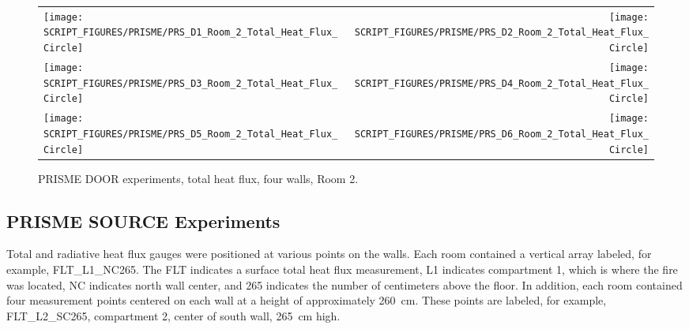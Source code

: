 \begin{figure}[p]
\begin{tabular*}{\textwidth}{l@{\extracolsep{\fill}}r}
\texttt{[image: SCRIPT\_FIGURES/PRISME/PRS\_D1\_Room\_2\_Total\_Heat\_Flux\_Circle]} &
\texttt{[image: SCRIPT\_FIGURES/PRISME/PRS\_D2\_Room\_2\_Total\_Heat\_Flux\_Circle]} \\
\texttt{[image: SCRIPT\_FIGURES/PRISME/PRS\_D3\_Room\_2\_Total\_Heat\_Flux\_Circle]} &
\texttt{[image: SCRIPT\_FIGURES/PRISME/PRS\_D4\_Room\_2\_Total\_Heat\_Flux\_Circle]} \\
\texttt{[image: SCRIPT\_FIGURES/PRISME/PRS\_D5\_Room\_2\_Total\_Heat\_Flux\_Circle]} &
\texttt{[image: SCRIPT\_FIGURES/PRISME/PRS\_D6\_Room\_2\_Total\_Heat\_Flux\_Circle]}
\end{tabular*}
\caption[PRISME DOOR experiments, total heat flux, four walls, Room 2]{PRISME DOOR experiments, total heat flux, four walls, Room 2.}
\label{PRISME_Wall_Circle_THF_Room_2}
\end{figure}



\clearpage


\subsection{PRISME SOURCE Experiments}

Total and radiative heat flux gauges were positioned at various points on the walls. Each room contained a vertical array labeled, for example, FLT\_L1\_NC265. The FLT indicates a surface total heat flux measurement, L1 indicates compartment 1, which is where the fire was located, NC indicates north wall center, and 265 indicates the number of centimeters above the floor. In addition, each room contained four measurement points centered on each wall at a height of approximately 260~cm. These points are labeled, for example, FLT\_L2\_SC265, compartment 2, center of south wall, 265~cm high.

